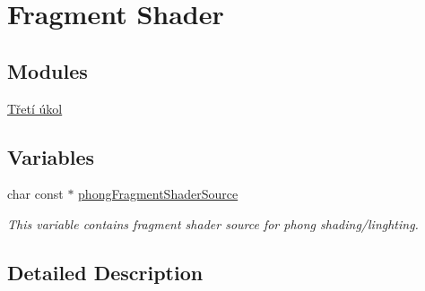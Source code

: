 \hypertarget{group__fs}{\section{Fragment Shader}
\label{group__fs}
}
\subsection*{Modules}
\begin{DoxyCompactItemize}
\item 
\hyperlink{group__task3}{Třetí úkol}
\end{DoxyCompactItemize}
\subsection*{Variables}
\begin{DoxyCompactItemize}
\item 
\hypertarget{group__fs_ga1ad4f4cb5068a39b247fbd8bb4428a75}{char const $\ast$ \hyperlink{group__fs_ga1ad4f4cb5068a39b247fbd8bb4428a75}{phong\-Fragment\-Shader\-Source}}\label{group__fs_ga1ad4f4cb5068a39b247fbd8bb4428a75}

\begin{DoxyCompactList}\small\item\em This variable contains fragment shader source for phong shading/linghting. \end{DoxyCompactList}\end{DoxyCompactItemize}


\subsection{Detailed Description}
